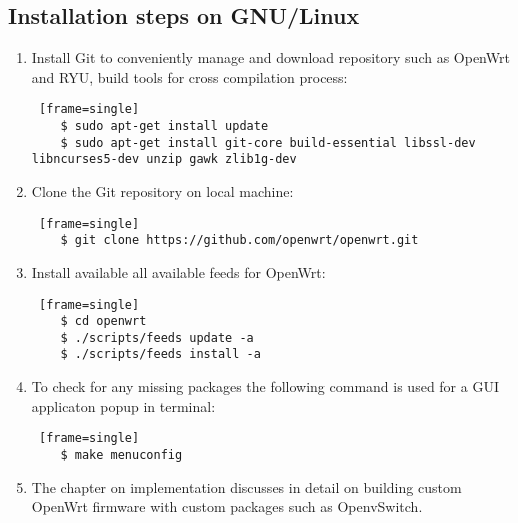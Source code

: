 \subsection{Installation steps on GNU/Linux}
\begin{enumerate}
	\item Install Git to conveniently manage and download repository such as OpenWrt and RYU, build tools for cross compilation process: 
	\begin{lstlisting} [frame=single]
	$ sudo apt-get install update
	$ sudo apt-get install git-core build-essential libssl-dev libncurses5-dev unzip gawk zlib1g-dev
	\end{lstlisting}
	\item Clone the Git repository on local machine: 
	\begin{lstlisting} [frame=single]
	$ git clone https://github.com/openwrt/openwrt.git
	\end{lstlisting}
	\item Install available all available feeds for OpenWrt: 
	\begin{lstlisting} [frame=single]
	$ cd openwrt
	$ ./scripts/feeds update -a
	$ ./scripts/feeds install -a
	\end{lstlisting}
	\item To check for any missing packages the following command is used for a GUI applicaton popup in terminal:
	\begin{lstlisting} [frame=single]
	$ make menuconfig
	\end{lstlisting}
	\item The chapter on implementation discusses in detail on building custom OpenWrt firmware with custom packages such as OpenvSwitch.
	
\end{enumerate}